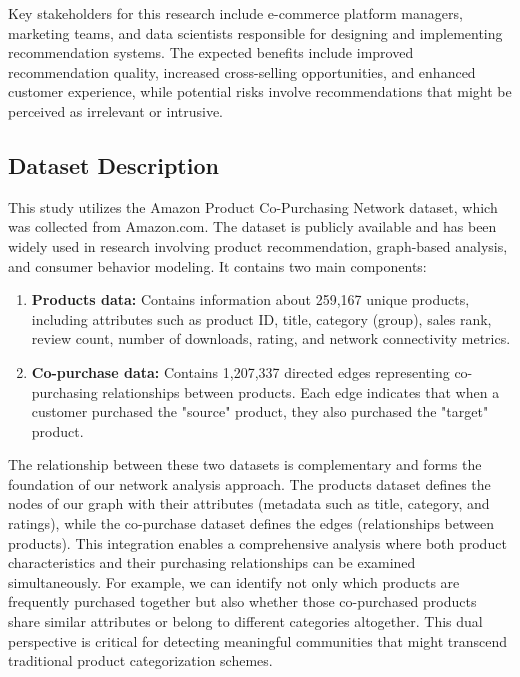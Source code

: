 \documentclass[conference]{IEEEtran}
\begin{document}
Key stakeholders for this research include e-commerce platform managers, marketing teams, and data scientists responsible for designing and implementing recommendation systems. The expected benefits include improved recommendation quality, increased cross-selling opportunities, and enhanced customer experience, while potential risks involve recommendations that might be perceived as irrelevant or intrusive.

\subsection{Dataset Description}
This study utilizes the Amazon Product Co-Purchasing Network dataset, which was collected from Amazon.com. The dataset is publicly available and has been widely used in research involving product recommendation, graph-based analysis, and consumer behavior modeling. It contains two main components:

\begin{enumerate}
    \item \textbf{Products data:} Contains information about 259,167 unique products, including attributes such as product ID, title, category (group), sales rank, review count, number of downloads, rating, and network connectivity metrics.
    
    \item \textbf{Co-purchase data:} Contains 1,207,337 directed edges representing co-purchasing relationships between products. Each edge indicates that when a customer purchased the "source" product, they also purchased the "target" product.
\end{enumerate}

The relationship between these two datasets is complementary and forms the foundation of our network analysis approach. The products dataset defines the nodes of our graph with their attributes (metadata such as title, category, and ratings), while the co-purchase dataset defines the edges (relationships between products). This integration enables a comprehensive analysis where both product characteristics and their purchasing relationships can be examined simultaneously. For example, we can identify not only which products are frequently purchased together but also whether those co-purchased products share similar attributes or belong to different categories altogether. This dual perspective is critical for detecting meaningful communities that might transcend traditional product categorization schemes.
\end{document}
